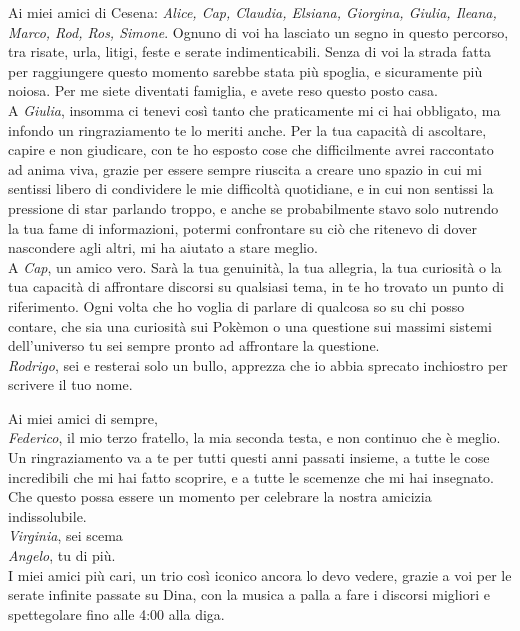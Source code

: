 \documentclass[12pt,a4paper,twoside]{book}
\begin{document}
Ai miei amici di Cesena: \emph{Alice, Cap, Claudia, Elsiana, Giorgina, Giulia, Ileana, Marco, Rod, Ros, Simone}.
Ognuno di voi ha lasciato un segno in questo percorso, tra risate, urla, litigi,
feste e serate indimenticabili. Senza di voi la strada fatta per raggiungere questo
momento sarebbe stata più spoglia, e sicuramente più noiosa.
Per me siete diventati famiglia, e avete reso questo posto casa. \\
A \emph{Giulia}, insomma ci tenevi così tanto che praticamente mi ci hai obbligato, ma infondo un
ringraziamento te lo meriti anche. Per la tua capacità di ascoltare, capire e non giudicare,
con te ho esposto cose che difficilmente avrei raccontato ad anima viva, grazie per
essere sempre riuscita a creare uno spazio in cui mi sentissi libero di condividere le
mie difficoltà quotidiane, e in cui non sentissi la pressione di star parlando troppo,
e anche se probabilmente stavo solo nutrendo la tua fame di informazioni, potermi confrontare
su ciò che ritenevo di dover nascondere agli altri, mi ha aiutato a stare meglio. \\
A \emph{Cap}, un amico vero. Sarà la tua genuinità, la tua allegria, la tua 
curiosità o la tua capacità di affrontare discorsi su qualsiasi tema, in te ho 
trovato un punto di riferimento. Ogni volta che ho voglia di parlare di qualcosa so su 
chi posso contare, che sia una curiosità sui Pokèmon o una questione sui massimi 
sistemi dell'universo tu sei sempre pronto ad affrontare la questione. \\
\emph{Rodrigo}, sei e resterai solo un bullo, apprezza che io abbia sprecato 
inchiostro per scrivere il tuo nome.

Ai miei amici di sempre, \\
\emph{Federico}, il mio terzo fratello, la mia seconda testa, e non continuo che è meglio.
Un ringraziamento va a te per tutti questi anni passati insieme, a tutte le cose 
incredibili che mi hai fatto scoprire, e a tutte le scemenze che mi hai insegnato. 
Che questo possa essere un momento per celebrare la nostra amicizia indissolubile. \\
\emph{Virginia}, sei scema \\
\emph{Angelo}, tu di più. \\
I miei amici più cari, un trio così iconico ancora lo devo vedere, grazie a voi
per le serate infinite passate su Dina, con la musica a palla a fare i
discorsi migliori e spettegolare fino alle 4:00 alla diga.

\end{document}
